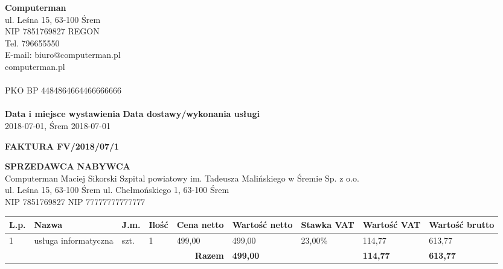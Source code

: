 \documentclass[a4paper,10pt]{article}
\date{}
\begin{document}
    \noindent
    \textbf{Computerman}\\
    ul. Leśna 15, 63-100 Śrem\\
    NIP 7851769827 REGON \\
    Tel. 796655550\\
    E-mail: biuro@computerman.pl\\
    computerman.pl\\
    \\
    PKO BP
    4484864664466666666\\
    \\
  
\noindent
    \textbf{Data i miejsce wystawienia}		\hfill \textbf{Data dostawy/wykonania usługi}\\
    2018-07-01, Śrem							        \hfill	2018-07-01\\
  
    \begin{center}
    \textbf{\huge{FAKTURA FV/2018/07/1}}
    \end{center}
    \vspace{2cm}
  
    \noindent
    \textbf{SPRZEDAWCA}						\hfill \textbf{NABYWCA}\\
    Computerman Maciej Sikorski					                        \hfill Szpital powiatowy im. Tadeusza Malińskiego w Śremie Sp. z o.o.\\
    ul. Leśna 15, 63-100 Śrem								            \hfill ul. Chełmońskiego 1, 63-100 Śrem\\
    NIP 7851769827								        \hfill NIP 77777777777777\\
  
    \begin{table}[H]
    \raggedleft
    \begin{tabular}{| p{} | p{}  | p{} | p{}| p{} | p{} | p{} | p{} | p{} |}
    \hline
    \textbf{L.p.} & \textbf{Nazwa} & \textbf{J.m.} & \textbf{Ilość} & \textbf{Cena netto} & \textbf{Wartość netto} & \textbf{Stawka VAT} & \textbf{Wartość VAT} & \textbf{Wartość brutto} \\ \hline
  
    1 & usługa informatyczna & szt. & 1 & 499,00 & 499,00 & 23,00\% & 114,77 & 613,77 \\ \hline
  
    \hline
    \multicolumn{5}{|r|}{\textbf{Razem}} & \textbf{499,00} & \cellcolor[gray]{0.9} & \textbf{114,77} & \textbf{613,77} \\ \hline
    \end{tabular}
    \end{table}
  
\end{document}
